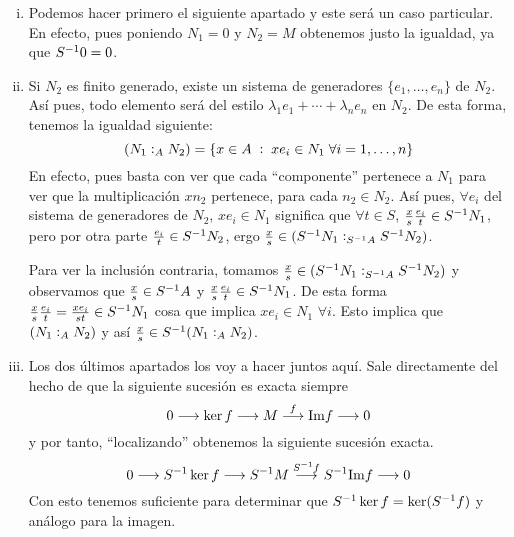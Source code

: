 \documentclass[../../../main.tex]{subfiles}
\begin{document}
\begin{sol}
\begin{enumerate}[(i)]
    \item Podemos hacer primero el siguiente apartado y este será un caso particular. En efecto, pues poniendo $N_1 = 0$ y $N_2 = M$ obtenemos justo la igualdad, ya que $S^{-1} 0 = 0$.
    
    \item Si $N_2$ es finito generado, existe un sistema de generadores $\{e_1,\ldots,e_n\}$ de $N_2$. Así pues, todo elemento será del estilo $\lambda_1e_1+\cdots+\lambda_ne_n$ en $N_2$. De esta forma, tenemos la igualdad siguiente:
    \begin{equation}
        \notag
        (N_1:_{A}N_2) = \{x\in A\;:\;xe_i\in N_1\;\forall i=1,\ldots,n\}
    \end{equation}
    En efecto, pues basta con ver que cada ``componente'' pertenece a $N_1$ para ver que la multiplicación $xn_2$ pertenece, para cada $n_2\in N_2$. Así pues, $\forall e_i$ del sistema de generadores de $N_2$, $xe_i\in 
    N_1$ significa que $\forall t\in S$, $\frac{x}{s}\frac{e_i}{t}\in S^{-1} N_1$, pero por otra parte $\frac{e_i}{t}\in S^{-1} N_2$, ergo $\frac{x}{s}\in(S^{-1} N_1:_{S^{-1} A}S^{-1} N_2)$.
    
    Para ver la inclusión contraria, tomamos $\frac{x}{s}\in(S^{-1} N_1:_{S^{-1} A}S^{-1} N_2)$ y observamos que $\frac{x}{s}\in S^{-1} A$ y $\frac{x}{s}\frac{e_i}{t}\in S^{-1} N_1$. De esta forma $\frac{x}{s}\frac{e_i}{t} = \frac{xe_i}{st}\in S^{-1} N_1$ cosa que implica $xe_i\in N_1$ $\forall i$. Esto implica que $(N_1:_{A}N_2)$ y así $\frac{x}{s}\in S^{-1}(N_1:_{A}N_2)$.
    
    \item Los dos últimos apartados los voy a hacer juntos aquí. Sale directamente del hecho de que la siguiente sucesión es exacta siempre
    \begin{equation}
        \notag
        0\longrightarrow\ker f\longrightarrow M\overset{f}{\longrightarrow }\mathrm{Im}f\longrightarrow 0
    \end{equation}
    y por tanto, ``localizando'' obtenemos la siguiente sucesión exacta.
    \begin{equation}
        \notag
        0\longrightarrow S^{-1} \ker f\longrightarrow S^{-1} M\overset{S^{-1} f}{\longrightarrow}S^{-1}\mathrm{Im}f\longrightarrow 0
    \end{equation}
    Con esto tenemos suficiente para determinar que $S^{-1} \ker f = \ker(S^{-1} f)$ y análogo para la imagen.
\end{enumerate}
\end{sol}
\end{document}
